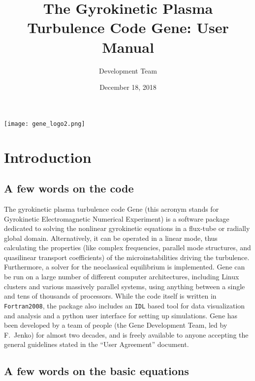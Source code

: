 \documentclass[12pt]{article}
\begin{document}
\title{The Gyrokinetic Plasma Turbulence Code {\sc Gene}: User Manual}
\vspace{1cm}
\date{\Large December 18, 2018}
\author{\gene Development Team}

\maketitle

\vspace{2cm}
\begin{center}
\texttt{[image: gene\_logo2.png]}
\end{center}

\thispagestyle{empty}
\newpage

\tableofcontents

\newpage
\section{Introduction}
\label{sec:intro}

\subsection{A few words on the code}
The gyrokinetic plasma turbulence code {\sc Gene} (this acronym stands for Gyrokinetic Electromagnetic
Numerical Experiment) is a software package dedicated to solving the nonlinear gyrokinetic
equations in a flux-tube or radially global domain. Alternatively, it can be operated in a linear mode, thus
calculating the properties (like complex frequencies, parallel mode structures, and quasilinear
transport coefficients) of the microinstabilities driving the turbulence. Furthermore, a solver for the neoclassical
equilibrium is implemented. {\sc Gene} can be run on
a large number of different computer architectures, including Linux clusters and various massively
parallel systems, using anything between a single and tens of thousands of processors. While the code
itself is written in {\tt Fortran2008}, the package also includes an {\tt IDL} based tool for data
visualization and analysis and a python user interface for setting up simulations. {\sc Gene} has been developed
by a team of people (the Gene Development Team, led by F.~Jenko) for almost two decades, and is freely available to anyone accepting the general guidelines stated in the ``User Agreement'' document.


\subsection{A few words on the basic equations}
\end{document}
